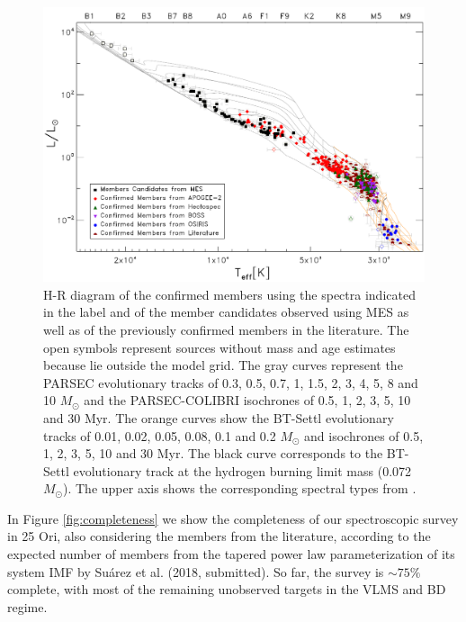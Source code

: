 \documentclass[12pt]{article}
\begin{document}
\begin{figure}[ht!]
	\includegraphics[width=1.0\textwidth]{HR_25Ori.pdf}
	\caption[H-R diagram of all the so far confirmed members in this work and of the member candidates to high/intermediate mass stars.]{H-R diagram of the confirmed members using the spectra indicated in the label and of the member candidates observed using MES as well as of the previously confirmed members in the literature. The open symbols represent sources without mass and age estimates because lie outside the model grid. The gray curves represent the PARSEC evolutionary tracks of 0.3, 0.5, 0.7, 1, 1.5, 2, 3, 4, 5, 8 and 10 $M_\odot$ and the PARSEC-COLIBRI isochrones of 0.5, 1, 2, 3, 5, 10 and 30 Myr. The orange curves show the BT-Settl evolutionary tracks of 0.01, 0.02, 0.05, 0.08, 0.1 and 0.2 $M_\odot$ and isochrones of 0.5, 1, 2, 3, 5, 10 and 30 Myr. The black curve corresponds to the BT-Settl evolutionary track at the hydrogen burning limit mass (0.072 $M_\odot$). The upper axis shows the corresponding spectral types from \citet{Pecaut2013}.}
	\label{fig:HR_all}
\end{figure}

In Figure \ref{fig:completeness} we show the completeness of our spectroscopic survey in 25 Ori, also considering the members from the literature, according to the expected number of members from the tapered power law parameterization of its system IMF by Su\'arez et al. (2018, submitted). So far, the survey is $\sim75\%$ complete, with most of the remaining unobserved targets in the VLMS and BD regime. %
\end{document}
